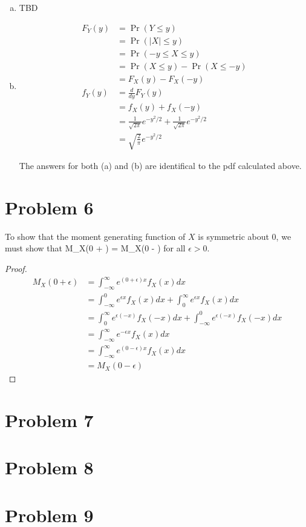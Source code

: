 \documentclass[11pt]{article}
\begin{document}
\begin{enumerate}[(a)]
    \item TBD

    \item 
      \begin{align*}
        F_Y(y) &= \Pr(Y \le y) \\
        &= \Pr(|X| \le y) \\
        &= \Pr(-y \le X \le y) \\
        &= \Pr(X \le y) - \Pr(X \le -y) \\
        &= F_X(y) - F_X(-y) \\
        f_Y(y) &= \frac{d}{dy} F_Y(y) \\
        &= f_X(y) + f_X(-y) \\
        &= \frac{1}{\sqrt{2 \pi}} e^{-y^2/2} + \frac{1}{\sqrt{2 \pi}} e^{-y^2/2} \\
        &= \sqrt{\frac{2}{\pi}} e^{-y^2/2}
      \end{align*}

      The answers for both (a) and (b) are identifical to the pdf calculated above.

\end{enumerate}

\section*{Problem 6}

To show that the moment generating function of $X$ is symmetric about 0, we must show that M_X(0 + \epsilon) = M_X(0 - \epsilon) for all $\epsilon > 0$.

\begin{proof}

\begin{align*}
  M_X(0 + \epsilon) &= \int_{-\infty}^{\infty} e^{(0+\epsilon)x}f_X(x) dx \\
  &= \int_{-\infty}^0 e^{\epsilon x} f_X(x) dx + \int_0^{\infty} e^{\epsilon x} f_X(x) dx \\
  &= \int_0^{\infty} e^{\epsilon (-x)} f_X(-x) dx + \int_{-\infty}^0 e^{\epsilon (-x)} f_X(-x) dx \\
  &= \int_{-\infty}^{\infty} e^{-\epsilon x} f_X(x) dx \\
  &= \int_{-\infty}^{\infty} e^{(0-\epsilon)x} f_X(x) dx \\
  &= M_X(0-\epsilon)
\end{align*}

\end{proof}

\section*{Problem 7}



\section*{Problem 8}


\section*{Problem 9}
\end{document}

